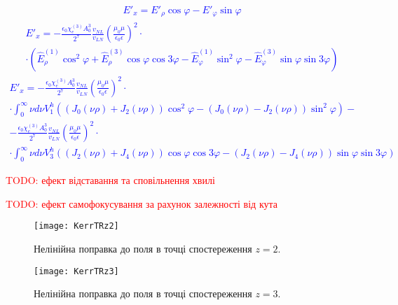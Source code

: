 \textcolor{blue} { \begin{equation*} \begin{aligned}
E'_x = E'_\rho \cos \varphi - E'_\varphi \sin \varphi
\end{aligned} \end{equation*} }
%
\textcolor{blue} { \begin{equation*} \begin{aligned}
E'_x = - \frac{\epsilon_0 \chi_e^{(3)} A_0^3}{2^7} \frac{v_{NL}}{v_{LN}}
\left( \frac{\mu_0 \mu}{\epsilon_0 \epsilon} \right)^2 \cdot \\ \cdot
\left(\hat{E}_\rho^{(1)} \cos^2 \varphi +
\hat{E}_\rho^{(3)} \cos \varphi \cos 3 \varphi - 
\hat{E}_\varphi^{(1)} \sin^2 \varphi -
\hat{E}_\varphi^{(3)} \sin \varphi \sin 3 \varphi \right)
\end{aligned} \end{equation*} }
%
\textcolor{blue} { \begin{equation*} \begin{aligned}
E'_x = - \frac{\epsilon_0 \chi_e^{(3)} A_0^3}{2^7} \frac{v_{NL}}{v_{LN}}
\left( \frac{\mu_0 \mu}{\epsilon_0 \epsilon} \right)^2 \cdot \\ \cdot
\int_0^\infty \nu d \nu V_1^h \left( 
\left( J_0 (\nu \rho) + J_2 (\nu \rho) \right) \cos^2 \varphi -
\left( J_0 (\nu \rho) - J_2 (\nu \rho) \right) \sin^2 \varphi \right) - \\
- \frac{\epsilon_0 \chi_e^{(3)} A_0^3}{2^7} \frac{v_{NL}}{v_{LN}}
\left( \frac{\mu_0 \mu}{\epsilon_0 \epsilon} \right)^2 \cdot \\ \cdot
\int_0^\infty \nu d \nu V_3^h \left( 
\left( J_2 (\nu \rho) + J_4 (\nu \rho) \right) \cos \varphi \cos 3 \varphi -
\left( J_2 (\nu \rho) - J_4 (\nu \rho) \right) \sin \varphi \sin 3 \varphi 
\right)
\end{aligned} \end{equation*} }

\textcolor{red} {TODO: ефект відставання та сповільнення хвилі}

\textcolor{red} {TODO: ефект самофокусування за рахунок залежності від кута}

\begin{figure}[htbp] \begin{center}
\texttt{[image: KerrTRz2]}
\caption{Нелінійна поправка до поля в точці спостереження $ z = 2 $.} 
\label{fig:KerrTRz2}
\end{center} \end{figure}

\begin{figure}[htbp] \begin{center}
\texttt{[image: KerrTRz3]}
\caption{Нелінійна поправка до поля в точці спостереження $ z = 3 $.} 
\label{fig:KerrTRz3}
\end{center} \end{figure}

